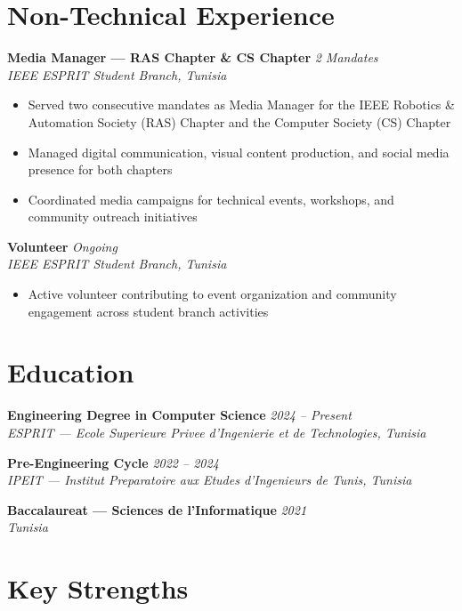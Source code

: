 \documentclass[10pt, a4paper]{article}
\newcommand{\jobentry}[3]{%
  \textbf{\color{navy}#1} \hfill \textit{\color{muted}\small #3}\\
  \textit{\color{muted}\small #2}%
}
\begin{document}
\section{Non-Technical Experience}

\jobentry{Media Manager --- RAS Chapter \& CS Chapter}{IEEE ESPRIT Student Branch, Tunisia}{2 Mandates}
\begin{itemize}
  \item Served two consecutive mandates as Media Manager for the IEEE Robotics \& Automation Society (RAS) Chapter and the Computer Society (CS) Chapter
  \item Managed digital communication, visual content production, and social media presence for both chapters
  \item Coordinated media campaigns for technical events, workshops, and community outreach initiatives
\end{itemize}

\vspace{4pt}
\jobentry{Volunteer}{IEEE ESPRIT Student Branch, Tunisia}{Ongoing}
\begin{itemize}
  \item Active volunteer contributing to event organization and community engagement across student branch activities
\end{itemize}

\section{Education}

\jobentry{Engineering Degree in Computer Science}{ESPRIT --- Ecole Superieure Privee d'Ingenierie et de Technologies, Tunisia}{2024 -- Present}

\vspace{4pt}
\jobentry{Pre-Engineering Cycle}{IPEIT --- Institut Preparatoire aux Etudes d'Ingenieurs de Tunis, Tunisia}{2022 -- 2024}

\vspace{4pt}
\jobentry{Baccalaureat --- Sciences de l'Informatique}{Tunisia}{2021}

\section{Key Strengths}
\end{document}
